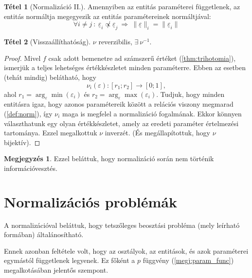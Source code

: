 \documentclass{article}
\theoremstyle{definition}
\newtheorem{theorem}{Tétel}[section]
\newtheorem*{megj}{Megjegyzés}
\newcommand{\vect}[1]{ \underline{#1} }
\newcommand{\norm}[1]{ \parallel {#1} \parallel }
\begin{document}
\begin{multicols}{2}
    \begin{theorem}[Normalizáció II.]
        Amennyiben az entitás paraméterei függetlenek, az entitás normáltja megegyezik az entitás paramétereinek normáltjával:
        \begin{equation}
            \forall i \neq j \ : \ 
            \vect\varepsilon_i \not \propto \vect\varepsilon_j 
            \ \Longrightarrow \
            \norm{\vect\varepsilon}_i = \norm{\vect\varepsilon_i}
        \end{equation}
    \end{theorem}
    
    \begin{theorem}[Visszaállíthatóság]
        $\nu$ reverzibilis, $\exists \ \nu^{-1}$.
        
        \begin{proof}
            Mivel $f$ csak adott bemenetre ad számszerű értéket (\ref{thm:trihotomia}), ismerjük a teljes lehetséges értékkészletet minden paraméterre. Ebben az esetben (tehát mindig) belátható, hogy 
            $$ \nu_i(\varepsilon) : [r_1; r_2] \to [0; 1], $$
            ahol $r_1 = \arg_\varepsilon\min(\varepsilon_i)$ és $r_2 = \arg_\varepsilon\max(\varepsilon_i)$.
            Tudjuk, hogy minden entitásra igaz, hogy azonos paramétereik között a relációs viszony megmarad (\ref{def:norm}), így $\nu_i$ maga is megfelel a normalizáció fogalmának. Ekkor könnyen választhatunk egy olyan értékkészletet, amely az eredeti paraméter értelmezési tartománya. Ezzel megalkottuk $\nu$ inverzét. (És megállapítottuk, hogy $\nu$ bijektív).
        \end{proof}
        \begin{megj}
            Ezzel beláttuk, hogy normalizáció során nem történik információvesztés.
        \end{megj}
    \end{theorem}
    
\section{Normalizációs problémák}
    A normalizációval beláttuk, hogy tetszőleges beosztási probléma (mely leírható \az{(\ref{def:problema})} formában) általánosítható. 
    
    Ennek azonban feltétele volt, hogy az osztályok, az entitások, és azok paraméterei egymástól függetlenek legyenek. Ez főként a $p$ függvény (\ref{megj:param_func}) megalkotásában jelentős szempont.
    

\end{multicols}
\end{document}
